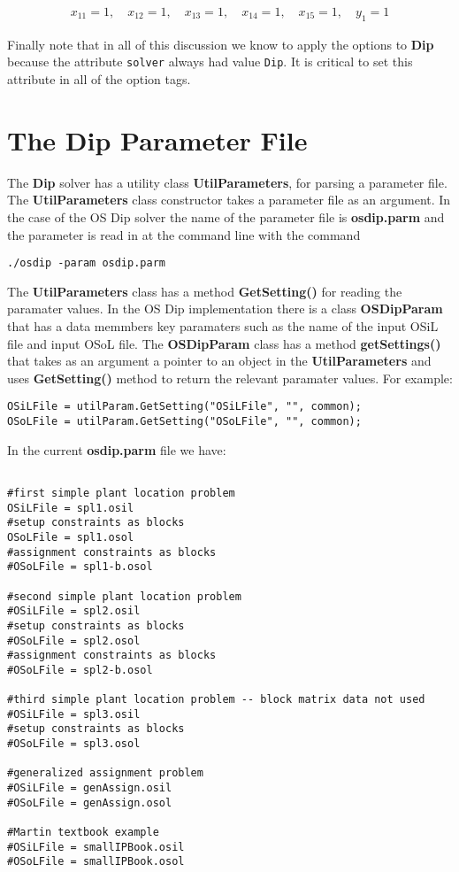 \documentclass[11pt]{article}
\begin{document}
\begin{eqnarray*}
x_{11} = 1, \quad  x_{12} = 1, \quad  x_{13} = 1, \quad  x_{14} = 1, \quad
x_{15} = 1, \quad y_{1} = 1
\end{eqnarray*}


Finally note that in all of this discussion we know to apply the options to {\bf
Dip} because the attribute {\tt solver} always had value {\tt Dip}. It is
critical to set this attribute in all of the option tags. 


\section{The Dip Parameter File}\label{section:paramaterfile}

The {\bf Dip} solver has a utility class {\bf UtilParameters},  for parsing
a parameter file. The {\bf UtilParameters} class constructor takes a parameter
file as an argument. In the case of the OS Dip solver the name of the parameter
file is {\bf osdip.parm} and the parameter is read in at the command line with
the command

\begin{verbatim}
./osdip -param osdip.parm
\end{verbatim}

The {\bf UtilParameters} class has a method {\bf GetSetting()} for reading the
paramater values. In the OS Dip implementation there is a class {\bf OSDipParam}
that has a data memmbers key paramaters such as the name of the input OSiL file
and input OSoL file. The {\bf OSDipParam} class has a method
{\bf getSettings()} that takes as an argument a pointer to an object in the {\bf
UtilParameters} and uses {\bf GetSetting()} method to return the relevant
paramater values. For example:

\begin{verbatim}
OSiLFile = utilParam.GetSetting("OSiLFile", "", common); 
OSoLFile = utilParam.GetSetting("OSoLFile", "", common);
\end{verbatim}

In the current {\bf osdip.parm} file we have:

\begin{verbatim}

#first simple plant location problem
OSiLFile = spl1.osil
#setup constraints as blocks
OSoLFile = spl1.osol
#assignment constraints as blocks
#OSoLFile = spl1-b.osol

#second simple plant location problem
#OSiLFile = spl2.osil
#setup constraints as blocks
#OSoLFile = spl2.osol
#assignment constraints as blocks
#OSoLFile = spl2-b.osol

#third simple plant location problem -- block matrix data not used
#OSiLFile = spl3.osil
#setup constraints as blocks
#OSoLFile = spl3.osol

#generalized assignment problem
#OSiLFile = genAssign.osil
#OSoLFile = genAssign.osol

#Martin textbook example
#OSiLFile = smallIPBook.osil
#OSoLFile = smallIPBook.osol
\end{verbatim}
 
\end{document}
